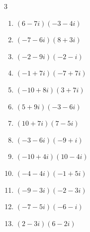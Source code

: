 \begin{multicols}{3}
\begin{enumerate}
  \item $\displaystyle (6-7i)(-3-4i)$

        \phantom{$\displaystyle =-46-3i$}

  \item $\displaystyle (-7-6i)(8+3i)$

        \phantom{$\displaystyle =-38-69i$}

  \item $\displaystyle (-2-9i)(-2-i)$

        \phantom{$\displaystyle =-5+20i$}

  \item $\displaystyle (-1+7i)(-7+7i)$

        \phantom{$\displaystyle =-42-56i$}

  \item $\displaystyle (-10+8i)(3+7i)$

        \phantom{$\displaystyle =-86-46i$}

  \item $\displaystyle (5+9i)(-3-6i)$

        \phantom{$\displaystyle =39-57i$}

  \item $\displaystyle (10+7i)(7-5i)$

        \phantom{$\displaystyle =105-i$}

  \item $\displaystyle (-3-6i)(-9+i)$

        \phantom{$\displaystyle =33+51i$}

  \item $\displaystyle (-10+4i)(10-4i)$

        \phantom{$\displaystyle =-84+80i$}

  \item $\displaystyle (-4-4i)(-1+5i)$

        \phantom{$\displaystyle =24-16i$}

\columnbreak %

  \item $\displaystyle (-9-3i)(-2-3i)$

        \phantom{$\displaystyle =9+33i$}

  \item $\displaystyle (-7-5i)(-6-i)$

        \phantom{$\displaystyle =37+37i$}

  \item $\displaystyle (2-3i)(6-2i)$


\end{enumerate}
\end{multicols}
